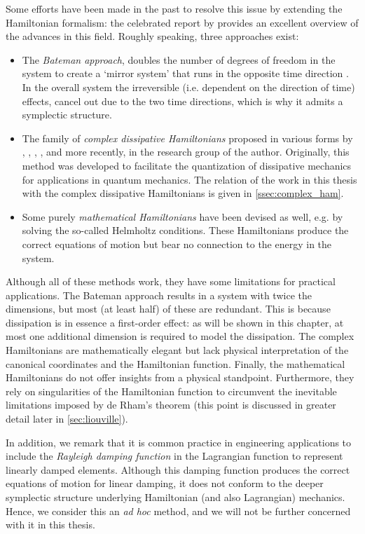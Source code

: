 Some efforts have been made in the past to resolve this issue by extending the Hamiltonian formalism: the celebrated report by \citet{Dekker1981} provides an excellent overview of the advances in this field. Roughly speaking, three approaches exist:
\begin{itemize}
    \item The \emph{Bateman approach}, doubles the number of degrees of freedom in the system to create a `mirror system' that runs in the opposite time direction \cite{Bateman1931}. In the overall system the irreversible (i.e. dependent on the direction of time) effects, cancel out due to the two time directions, which is why it admits a symplectic structure.
    \item The family of \emph{complex dissipative Hamiltonians} proposed in various forms by \citet{Bopp1974}, \citet{Dekker1975}, \citet{Dedene1980}, \citet{Rajeev2007}, and more recently, \citet{Hutters2020} in the research group of the author. Originally, this method was developed to facilitate the quantization of dissipative mechanics for applications in quantum mechanics. The relation of the work in this thesis with the complex dissipative Hamiltonians is given in \cref{ssec:complex_ham}.
    \item Some purely \emph{mathematical Hamiltonians} have been devised as well, e.g. by \citet{Havas1957} solving the so-called Helmholtz conditions. These Hamiltonians produce the correct equations of motion but bear no connection to the energy in the system.
\end{itemize}
Although all of these methods work, they have some limitations for practical applications. The Bateman approach results in a system with twice the dimensions, but most (at least half) of these are redundant. This is because dissipation is in essence a first-order effect: as will be shown in this chapter, at most one additional dimension is required to model the dissipation. The complex Hamiltonians are mathematically elegant but lack physical interpretation of the canonical  coordinates and the Hamiltonian function. Finally, the mathematical Hamiltonians do not offer insights from a physical standpoint. Furthermore, they rely on singularities of the Hamiltonian function to circumvent the inevitable limitations imposed by de Rham's theorem (this point is discussed in greater detail later in \cref{sec:liouville}).

In addition, we remark that it is common practice in engineering applications to include the \emph{Rayleigh damping function} in the Lagrangian function \cite{Goldstein2011} to represent linearly damped elements. Although this damping function produces the correct equations of motion for linear damping, it does not conform to the deeper symplectic structure underlying Hamiltonian (and also Lagrangian) mechanics. Hence, we consider this an \emph{ad hoc} method, and we will not be further concerned with it in this thesis.


